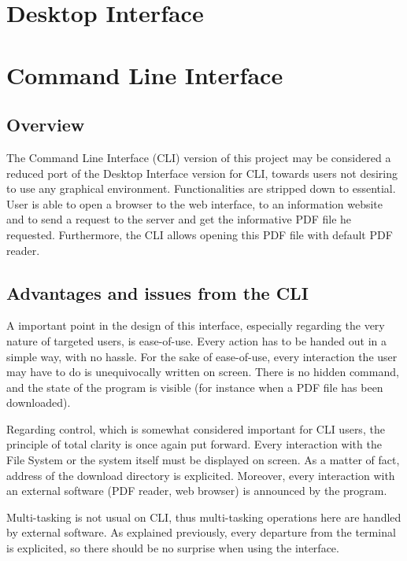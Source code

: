 \documentclass[a4paper,12pt, twocolumn]{article}
\begin{document}
\section*{Desktop Interface}

\section*{Command Line Interface}

\subsection*{Overview}

The Command Line Interface (CLI) version of this project may be considered a reduced port of the Desktop Interface version for CLI, towards users not desiring to use any graphical environment. Functionalities are stripped down to essential. User is able to open a browser to the web interface, to an information website and to send a request to the server and get the informative PDF file he requested. Furthermore, the CLI allows opening this PDF file with default PDF reader.

\subsection*{Advantages and issues from the CLI}

A important point in the design of this interface, especially regarding the very nature of targeted users, is ease-of-use. Every action has to be handed out in a simple way, with no hassle. For the sake of ease-of-use, every interaction the user may have to do is unequivocally written on screen. There is no hidden command, and the state of the program is visible (for instance when a PDF file has been downloaded).

Regarding control, which is somewhat considered important for CLI users, the principle of total clarity is once again put forward. Every interaction with the File System or the system itself must be displayed on screen. As a matter of fact, address of the download directory is explicited. Moreover, every interaction with an external software (PDF reader, web browser) is announced by the program.

Multi-tasking is not usual on CLI, thus multi-tasking operations here are handled by external software. As explained previously, every departure from the terminal is explicited, so there should be no surprise when using the interface.
\end{document}
